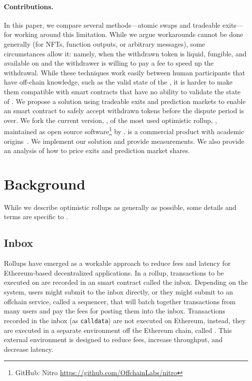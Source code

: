 \paragraph*{Contributions.} In this paper, we compare several methods---atomic swaps and tradeable exits---for working around this limitation. While we argue workarounds cannot be done generally (\eg for NFTs, function outputs, or arbitrary messages), some circumstances allow it: namely, when the withdrawn token is liquid, fungible, and available on \layerone and the withdrawer is willing to pay a fee to speed up the withdrawal.  While these techniques work easily between human participants that have off-chain knowledge, such as the valid state of the \layertwo, it is harder to make them compatible with \layerone smart contracts that have no ability to validate the state of \layertwo. We propose a solution using tradeable exits and prediction markets to enable an \layerone smart contract to safely accept withdrawn tokens before the dispute period is over. We fork the current version, \nitro, of the most used optimistic rollup, \arb, maintained as open source software\footnote{GitHub: Nitro \url{https://github.com/OffchainLabs/nitro}} by \offchain. \arb is a commercial product with academic origins~\cite{kalodner2018arbitrum}.  We implement our solution and provide measurements. We also provide an analysis of how to price exits and prediction market shares.  


 

\section{Background} 

While we describe optimistic rollups as generally as possible, some details and terms are specific to \arb. 

\subsection{Inbox} Rollups have emerged as a workable approach to reduce fees and latency for Ethereum-based decentralized applications. In a rollup,  transactions to be executed on \layertwo are recorded in an \layerone smart contract called the inbox. Depending on the system, users might submit to the inbox directly, or they might submit to an offchain service, called a sequencer, that will batch together transactions from many users and pay the \layerone fees for posting them into the inbox. Transactions recorded in the inbox (as \texttt{calldata}) are not executed on Ethereum, instead, they are executed in a separate environment off the Ethereum chain, called \layertwo. This external environment is designed to reduce fees, increase throughput, and decrease latency. 

